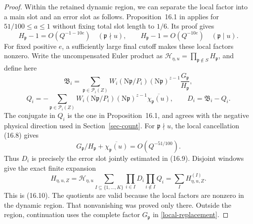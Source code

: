 \documentclass[10pt,reqno,a4paper]{amsart}
\theoremstyle{remark}
\newcommand{\N}{\mathrm N}
\newcommand{\pp}{\mathfrak p}
\begin{document}
\begin{proof}
Within the retained dynamic region, we can separate the local factor
into a main slot and an error slot as follows. Proposition~16.1 in \cite{q30} applies for $51/100\le a\le1$
without fixing total slot length to $1/6$. Its proof gives
\[
 H_\pp-1=O(Q^{-1-10e})\quad(\pp\nmid u),\qquad
 H_\pp-1=O(Q^{-10e})\quad(\pp\mid u).
\]
For fixed positive $e$, a sufficiently large final cutoff makes
these local factors nonzero. Write the uncompensated Euler product
as $\mathscr H_{\eta,u}=\prod_{\pp\notin S}H_\pp$, and define here
\[
 \mathfrak B_i=
   \sum_{\pp\in\mathcal P_i(Z)}
      W_i(\N\pp/P_i)(\N\pp)^{z-1}\frac{G_\pp}{H_\pp},
\]
\[
 Q_i=-\sum_{\pp\in\mathcal P_i(Z)}
        W_i(\N\pp/P_i)(\N\pp)^{z-1}
                         \overline{\chi_\pp(u)},
 \qquad D_i=\mathfrak B_i-Q_i.
\]
The conjugate in $Q_i$ is the one in Proposition~16.1, and agrees
with the negative physical direction used in Section~\ref{sec-count}.
For $\pp\nmid u$, the local cancellation (16.8) gives
\[
            G_\pp/H_\pp+\overline{\chi_\pp(u)}
                                     =O(Q^{-51/100}).
\]
Thus $D_i$ is precisely the error slot jointly estimated in (16.9).
Disjoint windows give the exact finite expansion
\begin{equation}\label{finite-expansion}
 H_{\eta,u,Z}
   =\mathscr H_{\eta,u}
       \sum_{I\subseteq\{1,\ldots,K\}}
          \prod_{i\in I}D_i\prod_{i\notin I}Q_i
   =\sum_I H^{(I)}_{\eta,u,Z}.
\end{equation}
This is (16.10). The quotients are valid because the local factors are nonzero in the
dynamic region. That nonvanishing was proved only there. Outside the
region, continuation uses the complete factor $G_\pp$ in
\eqref{local-replacement}.


\end{proof}
\end{document}
